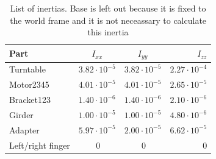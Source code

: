 \begin{table}[htbp]
\centering
\caption{List of inertias. Base is left out because it is fixed to the world frame and it is not neceassary to calculate this inertia}
\label{table:inertia}
    \begin{tabular}{l c c r}
        \toprule
        Part  &  $I_{xx}$ & $I_{yy}$ & $I_{zz}$\\
        \midrule
        Turntable & $3.82\cdot10^{-5}$ &  $3.82\cdot10^{-5}$ &$2.27\cdot10^{-4}$\\
        Motor2345 & $4.01\cdot10^{-5}$  & $4.01\cdot10^{-5}$  & $2.65\cdot10^{-5}$ \\
        Bracket123 & $1.40\cdot10^{-6} $ & $1.40\cdot10^{-6} $ & $2.10\cdot10^{-6} $ \\
        Girder & $1.00\cdot10^{-5} $ & $1.00\cdot10^{-5} $ & $4.80\cdot10^{-6} $\\
        Adapter & $5.97\cdot10^{-5} $ & $2.00\cdot10^{-5} $ & $6.62\cdot10^{-5} $\\
        Left/right finger & $~0$ & $~0$ & $0$\\
        \bottomrule
    \end{tabular}
\end{table}

